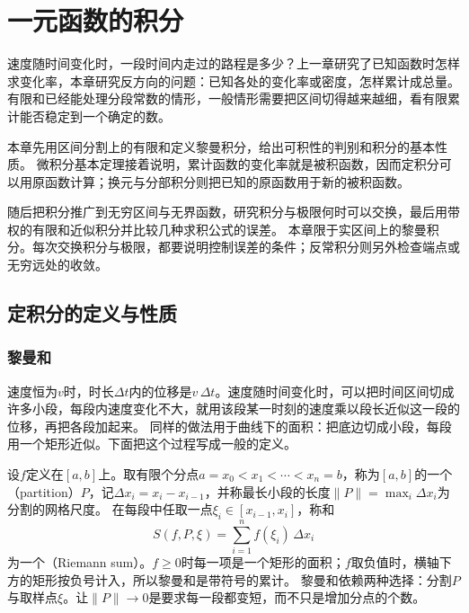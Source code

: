 \chapter{一元函数的积分}
\label{chap:univariate-integration}

速度随时间变化时，一段时间内走过的路程是多少？上一章研究了已知函数时怎样求变化率，本章研究反方向的问题：已知各处的变化率或密度，怎样累计成总量。
有限和已经能处理分段常数的情形，一般情形需要把区间切得越来越细，看有限累计能否稳定到一个确定的数。

本章先用区间分割上的有限和定义黎曼积分，给出可积性的判别和积分的基本性质。
微积分基本定理接着说明，累计函数的变化率就是被积函数，因而定积分可以用原函数计算；换元与分部积分则把已知的原函数用于新的被积函数。

随后把积分推广到无穷区间与无界函数，研究积分与极限何时可以交换，最后用带权的有限和近似积分并比较几种求积公式的误差。
本章限于实区间上的黎曼积分。每次交换积分与极限，都要说明控制误差的条件；反常积分则另外检查端点或无穷远处的收敛。

\section{定积分的定义与性质}
\label{sec:ru-riemann-integral}

\subsection{黎曼和}
\label{sec:ru-riemann-sums}

速度恒为$v$时，时长$\Delta t$内的位移是$v\,\Delta t$。速度随时间变化时，可以把时间区间切成许多小段，每段内速度变化不大，就用该段某一时刻的速度乘以段长近似这一段的位移，再把各段加起来。
同样的做法用于曲线下的面积：把底边切成小段，每段用一个矩形近似。下面把这个过程写成一般的定义。

设$f$定义在$[a,b]$上。取有限个分点$a=x_0<x_1<\cdots<x_n=b$，称为$[a,b]$的一个（partition）$P$，记$\Delta x_i=x_i-x_{i-1}$，并称最长小段的长度$\|P\|=\max_i\Delta x_i$为分割的网格尺度。
在每段中任取一点$\xi_i\in[x_{i-1},x_i]$，称和
\begin{equation}
 S(f,P,\xi)=\sum_{i=1}^nf(\xi_i)\,\Delta x_i
 \label{eq:ru-riemann-sum}
\end{equation}
为一个（Riemann sum）。$f\geq0$时每一项是一个矩形的面积；$f$取负值时，横轴下方的矩形按负号计入，所以黎曼和是带符号的累计。
黎曼和依赖两种选择：分割$P$与取样点$\xi$。让$\|P\|\to0$是要求每一段都变短，而不只是增加分点的个数。

